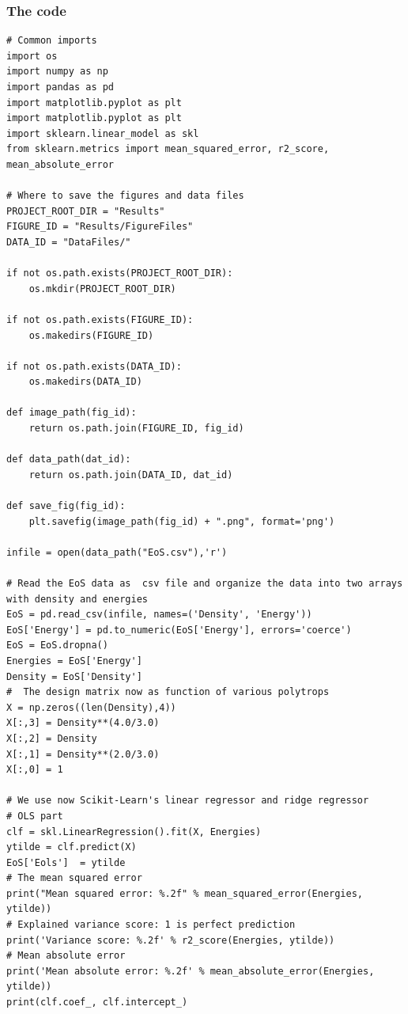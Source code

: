 \documentclass{beamer}
\begin{document}
\begin{frame}
\frametitle{The code}

\begin{verbatim}
# Common imports
import os
import numpy as np
import pandas as pd
import matplotlib.pyplot as plt
import matplotlib.pyplot as plt
import sklearn.linear_model as skl
from sklearn.metrics import mean_squared_error, r2_score, mean_absolute_error

# Where to save the figures and data files
PROJECT_ROOT_DIR = "Results"
FIGURE_ID = "Results/FigureFiles"
DATA_ID = "DataFiles/"

if not os.path.exists(PROJECT_ROOT_DIR):
    os.mkdir(PROJECT_ROOT_DIR)

if not os.path.exists(FIGURE_ID):
    os.makedirs(FIGURE_ID)

if not os.path.exists(DATA_ID):
    os.makedirs(DATA_ID)

def image_path(fig_id):
    return os.path.join(FIGURE_ID, fig_id)

def data_path(dat_id):
    return os.path.join(DATA_ID, dat_id)

def save_fig(fig_id):
    plt.savefig(image_path(fig_id) + ".png", format='png')

infile = open(data_path("EoS.csv"),'r')

# Read the EoS data as  csv file and organize the data into two arrays with density and energies
EoS = pd.read_csv(infile, names=('Density', 'Energy'))
EoS['Energy'] = pd.to_numeric(EoS['Energy'], errors='coerce')
EoS = EoS.dropna()
Energies = EoS['Energy']
Density = EoS['Density']
#  The design matrix now as function of various polytrops
X = np.zeros((len(Density),4))
X[:,3] = Density**(4.0/3.0)
X[:,2] = Density
X[:,1] = Density**(2.0/3.0)
X[:,0] = 1

# We use now Scikit-Learn's linear regressor and ridge regressor
# OLS part
clf = skl.LinearRegression().fit(X, Energies)
ytilde = clf.predict(X)
EoS['Eols']  = ytilde
# The mean squared error                               
print("Mean squared error: %.2f" % mean_squared_error(Energies, ytilde))
# Explained variance score: 1 is perfect prediction                                 
print('Variance score: %.2f' % r2_score(Energies, ytilde))
# Mean absolute error                                                           
print('Mean absolute error: %.2f' % mean_absolute_error(Energies, ytilde))
print(clf.coef_, clf.intercept_)


\end{verbatim}
\end{frame}
\end{document}
